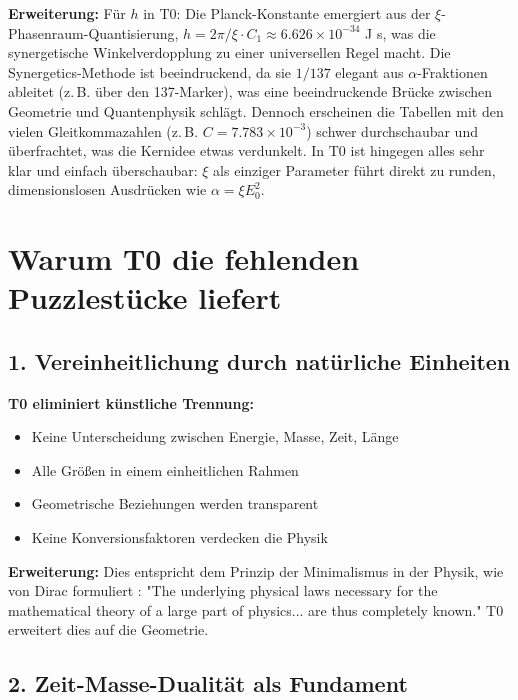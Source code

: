 \documentclass[12pt,a4paper]{article}
\newcommand{\xipar}{\xi}
\begin{document}
	\textbf{Erweiterung:} Für $h$ in T0: Die Planck-Konstante emergiert aus der $\xipar$-Phasenraum-Quantisierung, $h = 2\pi / \xipar \cdot C_1 \approx 6.626 \times 10^{-34}$ J s, was die synergetische Winkelverdopplung zu einer universellen Regel macht. Die Synergetics-Methode ist beeindruckend, da sie $1/137$ elegant aus $\alpha$-Fraktionen ableitet (z.\,B. über den 137-Marker), was eine beeindruckende Brücke zwischen Geometrie und Quantenphysik schlägt. Dennoch erscheinen die Tabellen mit den vielen Gleitkommazahlen (z.\,B. $C = 7.783 \times 10^{-3}$) schwer durchschaubar und überfrachtet, was die Kernidee etwas verdunkelt. In T0 ist hingegen alles sehr klar und einfach überschaubar: $\xipar$ als einziger Parameter führt direkt zu runden, dimensionslosen Ausdrücken wie $\alpha = \xipar E_0^2$.
	
	\section{Warum T0 die fehlenden Puzzlestücke liefert}
	
	\subsection{1. Vereinheitlichung durch natürliche Einheiten}
	
	\begin{vorteil}
		\textbf{T0 eliminiert künstliche Trennung:}
		\begin{itemize}
			\item Keine Unterscheidung zwischen Energie, Masse, Zeit, Länge
			\item Alle Größen in einem einheitlichen Rahmen
			\item Geometrische Beziehungen werden transparent
			\item Keine Konversionsfaktoren verdecken die Physik
		\end{itemize}
		
		\textbf{Erweiterung:} Dies entspricht dem Prinzip der Minimalismus in der Physik, wie von Dirac formuliert \cite{dirac_principles}: "The underlying physical laws necessary for the mathematical theory of a large part of physics... are thus completely known." T0 erweitert dies auf die Geometrie.
	\end{vorteil}
	
	\subsection{2. Zeit-Masse-Dualität als Fundament}
	
\end{document}
